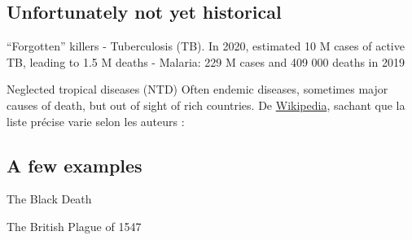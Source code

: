 \documentclass[aspectratio=43]{beamer}
\begin{document}
\subsection{Unfortunately not yet historical}
\begin{frame}{``Forgotten'' killers}
    - Tuberculosis (TB). In 2020, estimated 10 M cases of active TB, leading to 1.5 M deaths
    \vfill
    - Malaria: 229 M cases and 409 000 deaths in 2019
\end{frame}
    
    
\begin{frame}{Neglected tropical diseases (NTD)}
Often endemic diseases, sometimes major causes of death, but out of sight of rich countries. De \href{https://fr.wikipedia.org/wiki/Maladies_tropicales_négligées}{Wikipedia}, sachant que la liste précise varie selon les auteurs :
    
    
\end{frame}

\subsection{A few examples}


\begin{frame}{The Black Death}
\end{frame}

\begin{frame}{The British Plague of 1547}
\end{frame}
\end{document}
